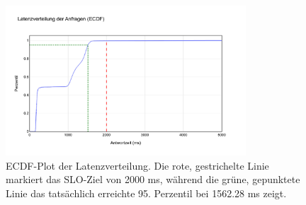 \begin{figure}[H]
    \centering
    \includegraphics[width=0.8\textwidth]{content/figures/svg/latenzanalyse.pdf}
    \caption{ECDF-Plot der Latenzverteilung. Die rote, gestrichelte Linie markiert das SLO-Ziel von 2000 ms, während die grüne, gepunktete Linie das tatsächlich erreichte 95. Perzentil bei 1562.28 ms zeigt.}
    \label{fig:latenz_ecdf}
\end{figure}
